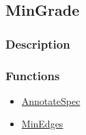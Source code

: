 \subsection{MinGrade}\label{MinGrade}
\subsubsection{Description}


\subsubsection{Functions}
\begin{itemize}
\item \hyperref[AnnotateSpec]{AnnotateSpec}
\item \hyperref[MinEdges]{MinEdges}
\end{itemize}

